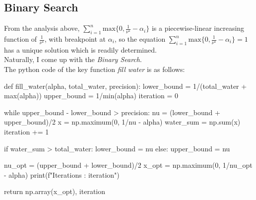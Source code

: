 \documentclass[12pt, a4paper, oneside]{article}
\begin{document}
\subsection{Binary Search}
From the analysis above, $\sum_{i = 1}^{n}\mbox{max}\{0, \frac{1}{\nu^{\star}} - \alpha_i\}$ is a piecewise-linear increasing function of $\frac{1}{\nu^{\star}}$, 
with breakpoint at $\alpha_i$, so the equation $\sum_{i = 1}^{n}\mbox{max}\{0, \frac{1}{\nu^{\star}} - \alpha_i\} = 1$ has a unique solution which is readily determined.\\
Naturally, I come up with the \textit{Binary Search}.\\
The python code of the key function \textit{fill water} is as follows: 
\begin{python}
def fill_water(alpha, total_water, precision):
    lower_bound = 1/(total_water + max(alpha))
    upper_bound = 1/min(alpha)
    iteration = 0

    while upper_bound - lower_bound > precision:
        nu = (lower_bound + upper_bound)/2
        x = np.maximum(0, 1/nu - alpha)
        water_sum = np.sum(x)
        iteration += 1

        if water_sum > total_water:
            lower_bound = nu
        else:
            upper_bound = nu
            
    nu_opt = (upper_bound + lower_bound)/2
    x_opt = np.maximum(0, 1/nu_opt - alpha)
    print(f"Iterations : {iteration}")

    return np.array(x_opt), iteration
\end{python}
\end{document}
